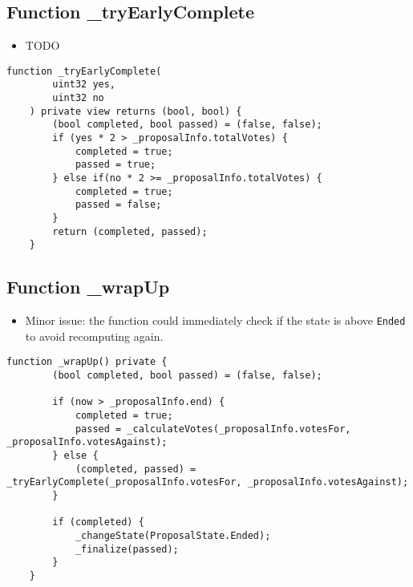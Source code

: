 \subsection{Function \_{}tryEarlyComplete}

\begin{itemize}
\item TODO
\end{itemize}

\begin{lstlisting}[firstnumber=101]
    function _tryEarlyComplete(
        uint32 yes,
        uint32 no
    ) private view returns (bool, bool) {
        (bool completed, bool passed) = (false, false);
        if (yes * 2 > _proposalInfo.totalVotes) {
            completed = true;
            passed = true;
        } else if(no * 2 >= _proposalInfo.totalVotes) {
            completed = true;
            passed = false;
        }
        return (completed, passed);
    }
\end{lstlisting}

\subsection{Function \_{}wrapUp}

\begin{itemize}
\item Minor issue: the function could immediately check if the state
  is above {\tt Ended} to avoid recomputing again.
\end{itemize}

\begin{lstlisting}[firstnumber=116]
    function _wrapUp() private {
        (bool completed, bool passed) = (false, false);

        if (now > _proposalInfo.end) {
            completed = true;
            passed = _calculateVotes(_proposalInfo.votesFor, _proposalInfo.votesAgainst);
        } else {
            (completed, passed) = _tryEarlyComplete(_proposalInfo.votesFor, _proposalInfo.votesAgainst);
        }

        if (completed) {
            _changeState(ProposalState.Ended);
            _finalize(passed);
        }
    }
\end{lstlisting}

